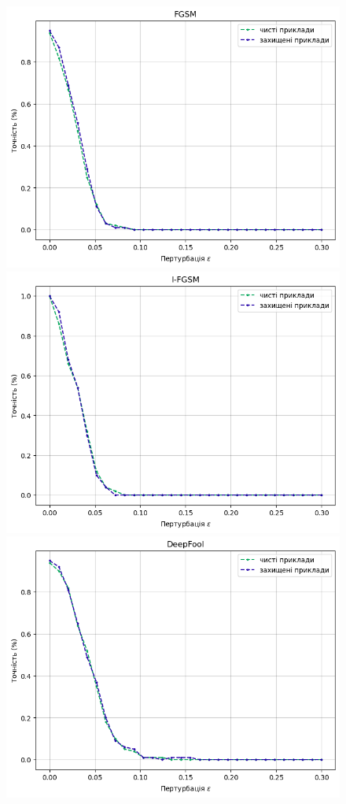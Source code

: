 \documentclass[a4paper,14pt]{extreport}
\begin{document}
	\begin{figure}[!htb]
		\includegraphics[width=1\textwidth]{resources/fgsm_defl_defence.png}
		\endminipage\hfill
		\includegraphics[width=1\textwidth]{resources/ifgsm_defl_defence.png}
		\endminipage
		\includegraphics[width=1\textwidth]{resources/deepfool_defl_defence.png}

\end{figure}
\end{document}
